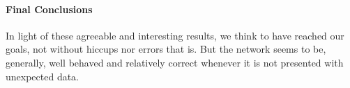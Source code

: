 \documentclass[10pt,journal,cspaper,compsoc]{IEEEtran}
\begin{document}
    \paragraph*{Final Conclusions}
    In light of these agreeable and interesting results, we think to have reached our goals, not without hiccups nor errors that is. But the network seems to be, generally, well behaved and relatively correct whenever it is not presented with unexpected data.

    \newpage
    
    
    
\end{document}
